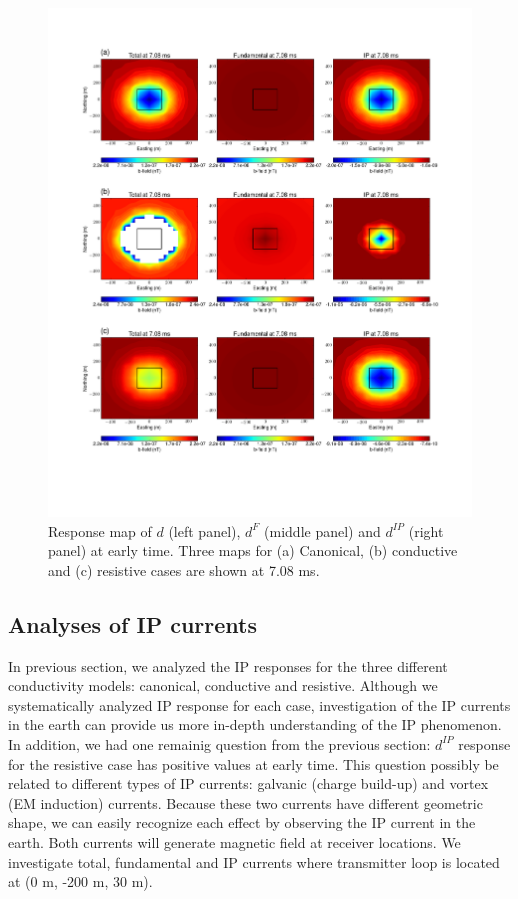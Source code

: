 \documentclass[a4paper, 11pt]{article}
\newcommand{\dip}{d^{IP}}
\begin{document}
\begin{figure}[htb]
  \centering  \includegraphics[width=1.0\textwidth]{figures/threecasesresp/IPresp_ch38.png}
  \caption{Response map of $d$ (left panel), $d^{F}$ (middle panel) and $\dip$ (right panel) at early time. Three maps for  (a) Canonical, (b) conductive and (c) resistive cases are shown at 7.08 ms.}
  \label{F:IPresp2}
\end{figure}
\clearpage
\subsection{Analyses of IP currents}
In previous section, we analyzed the IP responses for the three different conductivity models: canonical, conductive and resistive. Although we systematically analyzed IP response for each case, investigation of the IP currents in the earth can provide us more in-depth understanding of the IP phenomenon. In addition, we had one remainig question from the previous section: $\dip$ response for the resistive case has positive values at early time. This question possibly be related to different types of IP currents: galvanic (charge build-up) and vortex (EM induction) currents. Because these two currents have different geometric shape, we can easily recognize each effect by observing the IP current in the earth. Both currents will generate magnetic field at receiver locations. We investigate total, fundamental and IP currents where transmitter loop is located at (0 m, -200 m, 30 m). 
\end{document}
